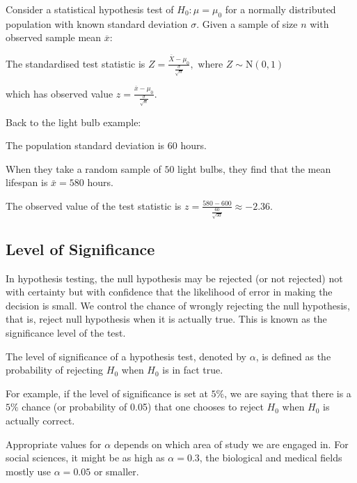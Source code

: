 \documentclass[11pt,a4paper]{book}
\begin{document}
\begin{tcolorbox}[colback=blue!5, colframe=black, boxrule=.4pt, sharpish corners]

Consider a statistical hypothesis test of $H_{0}:\mu=\mu_{0}$ for
a normally distributed population with known standard deviation $\sigma$.
Given a sample of size $n$ with observed sample mean $\overline{x}$:

The standardised test statistic is ${\displaystyle Z=\frac{\overline{X}-\mu_{0}}{\frac{\sigma}{\sqrt{n}}}},\text{ where }Z\sim\text{N}\left(0,1\right)$ 

which has observed value ${\displaystyle z=\frac{\overline{x}-\mu_{0}}{\frac{\sigma}{\sqrt{n}}}}$.
\end{tcolorbox}

Back to the light bulb example:

The population standard deviation is $60$ hours.

When they take a random sample of $50$ light bulbs, they find that
the mean lifespan is $\bar{x}=580$ hours.

The observed value of the test statistic is ${\displaystyle z=\frac{580-600}{\frac{60}{\sqrt{50}}}}\approx-2.36$.

\subsection{Level of Significance}

In hypothesis testing, the null hypothesis may be rejected (or not
rejected) not with certainty but with confidence that the likelihood
of error in making the decision is small. We control the chance of
wrongly rejecting the null hypothesis, that is, reject null hypothesis
when it is actually true. This is known as the significance level
of the test.

\begin{tcolorbox}[colback=blue!5, colframe=black, boxrule=.4pt, sharpish corners]

The level of significance of a hypothesis test, denoted by $\alpha$,
is defined as the probability of rejecting $H_{0}$ when $H_{0}$
is in fact true.
\end{tcolorbox}

For example, if the level of significance is set at $5\%$, we are
saying that there is a $5\%$ chance (or probability of 0.05) that
one chooses to reject $H_{0}$ when $H_{0}$ is actually correct. 

Appropriate values for $\alpha$ depends on which area of study we
are engaged in. For social sciences, it might be as high as $\alpha=0.3$,
the biological and medical fields mostly use $\alpha=0.05$ or smaller. 
\end{document}
